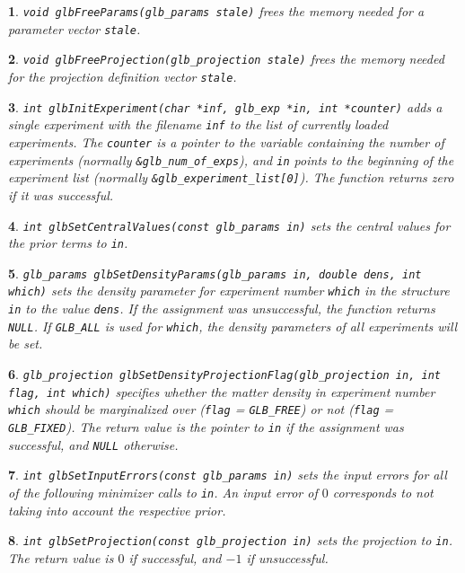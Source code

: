 \documentclass[12pt,a4paper]{article}
\theoremstyle{dotless}
\newtheorem*{function}{}
\begin{document}
\begin{function}
{\tt void glbFreeParams(glb\_params stale)} frees the memory
needed for a parameter vector {\tt stale}.
\end{function}

\begin{function}
{\tt void glbFreeProjection(glb\_projection stale)} frees the memory
needed for the projection definition vector {\tt stale}.
\end{function}

\begin{function}
{\tt int glbInitExperiment(char *inf, glb\_exp *in, int *counter)}
adds a single experiment with the filename {\tt inf} to the list of currently
loaded experiments. The {\tt counter} is a pointer to the variable containing
the number of experiments (normally {\tt \&glb\_num\_of\_exps}), and
{\tt in} points to the beginning of the experiment list (normally
{\tt \&glb\_experiment\_list[0]}). The function returns zero if it was
successful.
\end{function}

\begin{function}
{\tt int glbSetCentralValues(const glb\_params in)} sets the central
values for the prior terms to {\tt in}.
\end{function}

\begin{function}
{\tt glb\_params glbSetDensityParams(glb\_params in, double dens, int which)}
sets the density parameter for experiment number {\tt which} in the structure
{\tt in} to the value {\tt dens}. If the assignment was unsuccessful, the
function returns {\tt NULL}. If {\tt GLB\_ALL} is used for {\tt which},
the density parameters of all experiments will be set.
\end{function}

\begin{function}
{\tt glb\_projection glbSetDensityProjectionFlag(glb\_projection in,
int flag, int which)} specifies whether the matter density in experiment
number {\tt which} should be marginalized over ({\tt flag} = {\tt GLB\_FREE})
or not ({\tt flag} = {\tt GLB\_FIXED}). The return value is the pointer to {\tt in}
if the assignment was successful, and {\tt NULL} otherwise.
\end{function}

\begin{function}
{\tt int glbSetInputErrors(const glb\_params in)}
sets the input errors for all of the following minimizer calls to {\tt in}.
An input error of $0$ corresponds to not taking into account the
respective prior.
\end{function}

\begin{function}
{\tt int glbSetProjection(const glb\_projection in)} sets the projection
to {\tt in}. The return value is $0$ if successful, and $-1$ if
unsuccessful.
\end{function}
\end{document}
